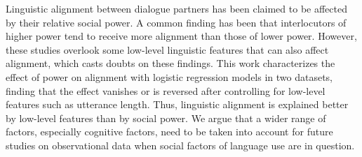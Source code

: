 Linguistic alignment between dialogue partners has been claimed to be affected by their relative social power. A common finding has been that interlocutors of higher power tend to receive more alignment than those of lower power. However, these studies overlook some low-level linguistic features that can also affect alignment, which casts doubts on these findings. This work characterizes the effect of power on alignment with logistic regression models in two datasets, finding that the effect vanishes or is reversed after controlling for low-level features such as utterance length. Thus, linguistic alignment is explained better by low-level features than by social power. We argue that a wider range of factors, especially cognitive factors, need to be taken into account for future studies on observational data when social factors of language use are in question.
